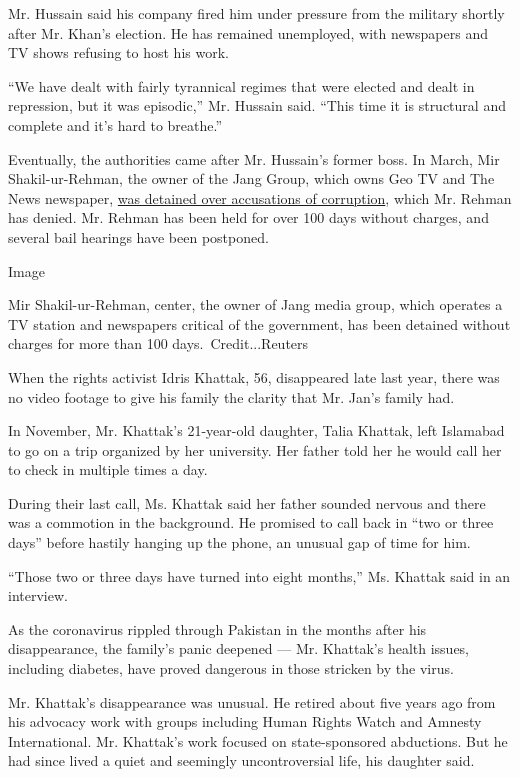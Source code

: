 Mr. Hussain said his company fired him under pressure from the military
shortly after Mr. Khan's election. He has remained unemployed, with
newspapers and TV shows refusing to host his work.

``We have dealt with fairly tyrannical regimes that were elected and
dealt in repression, but it was episodic,'' Mr. Hussain said. ``This
time it is structural and complete and it's hard to breathe.''

Eventually, the authorities came after Mr. Hussain's former boss. In
March, Mir Shakil-ur-Rehman, the owner of the Jang Group, which owns Geo
TV and The News newspaper,
\href{https://www.nytimes.com/2020/03/12/world/asia/pakistan-journalist-jang.html}{was
detained over accusations of corruption}, which Mr. Rehman has denied.
Mr. Rehman has been held for over 100 days without charges, and several
bail hearings have been postponed.

Image

Mir Shakil-ur-Rehman, center, the owner of Jang media group, which
operates a TV station and newspapers critical of the government, has
been detained without charges for more than 100 days.~Credit...Reuters

When the rights activist Idris Khattak, 56, disappeared late last year,
there was no video footage to give his family the clarity that Mr. Jan's
family had.

In November, Mr. Khattak's 21-year-old daughter, Talia Khattak, left
Islamabad to go on a trip organized by her university. Her father told
her he would call her to check in multiple times a day.

During their last call, Ms. Khattak said her father sounded nervous and
there was a commotion in the background. He promised to call back in
``two or three days'' before hastily hanging up the phone, an unusual
gap of time for him.

``Those two or three days have turned into eight months,'' Ms. Khattak
said in an interview.

As the coronavirus rippled through Pakistan in the months after his
disappearance, the family's panic deepened --- Mr. Khattak's health
issues, including diabetes, have proved dangerous in those stricken by
the virus.

Mr. Khattak's disappearance was unusual. He retired about five years ago
from his advocacy work with groups including Human Rights Watch and
Amnesty International. Mr. Khattak's work focused on state-sponsored
abductions. But he had since lived a quiet and seemingly uncontroversial
life, his daughter said.

